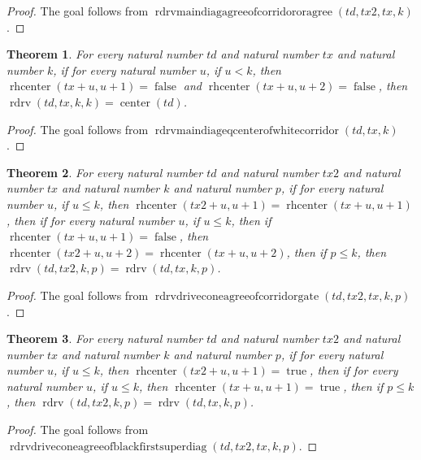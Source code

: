 \documentclass[11pt]{article}
\newtheorem{theorem}{Theorem}[section]
\theoremstyle{definition}
\begin{document}
\begin{proof}
The goal follows from \(\operatorname{rdrvmaindiagagreeofcorridororagree}(td, tx2, tx, k)\).
\end{proof}
\begin{theorem}
\label{ll:paper:rdrv-main-diag-eq-center-of-white-corridor}
For every natural number \(td\) and natural number \(tx\) and natural number \(k\), if for every natural number \(u\), if \(u < k\), then \(\operatorname{rhcenter}(tx + u, u + 1) = \operatorname{false}\) and \(\operatorname{rhcenter}(tx + u, u + 2) = \operatorname{false}\), then \(\operatorname{rdrv}(td, tx, k, k) = \operatorname{center}(td)\).
\end{theorem}
\begin{proof}
The goal follows from \(\operatorname{rdrvmaindiageqcenterofwhitecorridor}(td, tx, k)\).
\end{proof}
\begin{theorem}
\label{ll:paper:rdrv-drive-cone-agree-of-corridor-gate}
For every natural number \(td\) and natural number \(tx2\) and natural number \(tx\) and natural number \(k\) and natural number \(p\), if for every natural number \(u\), if \(u \le k\), then \(\operatorname{rhcenter}(tx2 + u, u + 1) = \operatorname{rhcenter}(tx + u, u + 1)\), then if for every natural number \(u\), if \(u \le k\), then if \(\operatorname{rhcenter}(tx + u, u + 1) = \operatorname{false}\), then \(\operatorname{rhcenter}(tx2 + u, u + 2) = \operatorname{rhcenter}(tx + u, u + 2)\), then if \(p \le k\), then \(\operatorname{rdrv}(td, tx2, k, p) = \operatorname{rdrv}(td, tx, k, p)\).
\end{theorem}
\begin{proof}
The goal follows from \(\operatorname{rdrvdriveconeagreeofcorridorgate}(td, tx2, tx, k, p)\).
\end{proof}
\begin{theorem}
\label{ll:paper:rdrv-drive-cone-agree-of-black-first-superdiag}
For every natural number \(td\) and natural number \(tx2\) and natural number \(tx\) and natural number \(k\) and natural number \(p\), if for every natural number \(u\), if \(u \le k\), then \(\operatorname{rhcenter}(tx2 + u, u + 1) = \operatorname{true}\), then if for every natural number \(u\), if \(u \le k\), then \(\operatorname{rhcenter}(tx + u, u + 1) = \operatorname{true}\), then if \(p \le k\), then \(\operatorname{rdrv}(td, tx2, k, p) = \operatorname{rdrv}(td, tx, k, p)\).
\end{theorem}
\begin{proof}
The goal follows from \(\operatorname{rdrvdriveconeagreeofblackfirstsuperdiag}(td, tx2, tx, k, p)\).
\end{proof}
\end{document}
